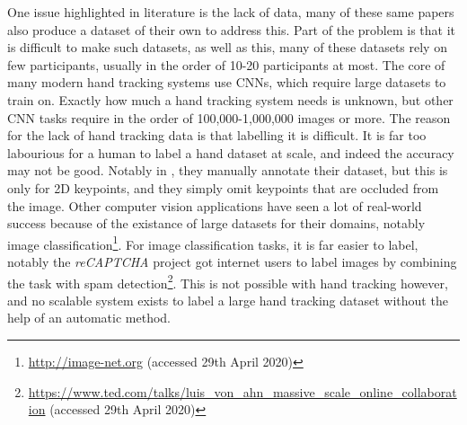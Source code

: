 One issue highlighted in literature is the lack of data, many of these same papers also produce a dataset of their own to address this. Part of the problem is that it is difficult to make such datasets, as well as this, many of these datasets rely on few participants, usually in the order of 10-20 participants at most. The core of many modern hand tracking systems use CNNs, which require large datasets to train on. Exactly how much a hand tracking system needs is unknown, but other CNN tasks require in the order of 100,000-1,000,000 images or more. The reason for the lack of hand tracking data is that labelling it is difficult. It is far too labourious for a human to label a hand dataset at scale, and indeed the accuracy may not be good. Notably in \cite{wang2018mask}, they manually annotate their dataset, but this is only for 2D keypoints, and they simply omit keypoints that are occluded from the image. Other computer vision applications have seen a lot of real-world success because of the existance of large datasets for their domains, notably image classification\footnote{\url{http://image-net.org} (accessed 29th April 2020)}. For image classification tasks, it is far easier to label, notably the {\slshape reCAPTCHA} project got internet users to label images by combining the task with spam detection\footnote{\url{https://www.ted.com/talks/luis_von_ahn_massive_scale_online_collaboration} (accessed 29th April 2020)}. This is not possible with hand tracking however, and no scalable system exists to label a large hand tracking dataset without the help of an automatic method.

